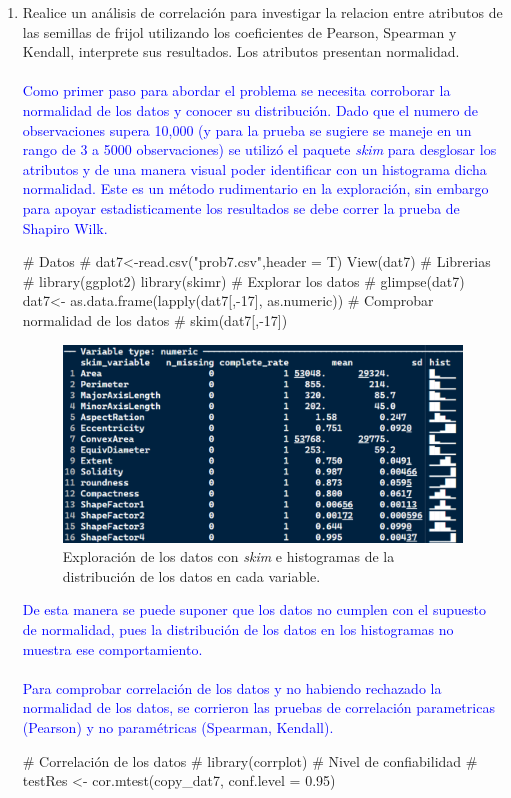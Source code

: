 \documentclass[a4paper,12pt]{article}
\begin{document}
\begin{enumerate} [label=\textbf{\alph*})]
\item Realice un análisis de correlación para investigar la relacion entre atributos de las semillas de frijol utilizando los coeficientes de Pearson, Spearman y Kendall, interprete sus resultados. Los atributos presentan normalidad.\\
\textcolor{blue}{\\Como primer paso para abordar el problema se necesita corroborar la normalidad de los datos y conocer su distribución. Dado que el numero de observaciones supera 10,000 (y para la prueba se sugiere se maneje en un rango de 3 a 5000 observaciones) se utilizó el paquete \textit{skim} para desglosar los atributos y de una manera visual poder identificar con un histograma dicha normalidad. Este es un método rudimentario en la exploración, sin embargo para apoyar estadisticamente los resultados se debe correr la prueba de Shapiro Wilk. }
	\begin{MyVerbatim}
# Datos #
dat7<-read.csv("prob7.csv",header = T)
View(dat7)
# Librerias #
library(ggplot2)
library(skimr)
# Explorar los datos #
glimpse(dat7)
dat7<- as.data.frame(lapply(dat7[,-17], as.numeric))
# Comprobar normalidad de los datos  #
skim(dat7[,-17])
	\end{MyVerbatim}
\begin{figure}[H]
	\centering
	\includegraphics[width=0.7\linewidth]{prob7_hist}
	\caption[prob7-hist]{Exploración de los datos con \textit{skim} e histogramas de la distribución de los datos en cada variable.}
	\label{fig:prob7hist}
\end{figure}
\textcolor{blue}{De esta manera se puede suponer que los datos no cumplen con el supuesto de normalidad, pues la distribución de los datos en los histogramas no muestra ese comportamiento.\\
\\Para comprobar correlación de los datos y no habiendo rechazado la normalidad de los datos, se corrieron las pruebas de correlación parametricas (Pearson) y no paramétricas (Spearman, Kendall).}
\begin{MyVerbatim}
# Correlación de los datos #
library(corrplot)
# Nivel de confiabilidad #
testRes <- cor.mtest(copy_dat7, conf.level = 0.95)


\end{MyVerbatim}
\end{enumerate}
\end{document}
